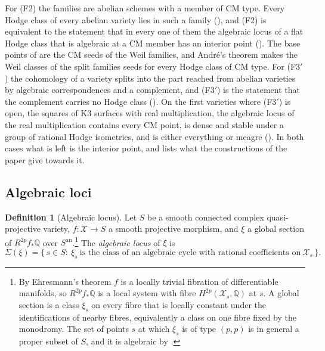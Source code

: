 \documentclass[11pt,reqno]{amsart}
\theoremstyle{plain}
\theoremstyle{definition}
\newtheorem{definition}[theorem]{Definition}
\theoremstyle{remark}
\newcommand{\QQ}{\mathbb{Q}}
\newcommand{\cX}{\mathcal{X}}
\begin{document}
For (F2) the families are abelian schemes with a member of CM type. Every
Hodge class of every abelian variety lies in such a family
(), and (F2) is equivalent to the statement that in every
one of them the algebraic locus of a flat Hodge class that is algebraic at a
CM member has an interior point (). The base points
of \cite[Theorem~17.5]{paperI} are the CM seeds of the Weil families, and
Andr\'e's theorem makes the Weil classes of the split families seeds for every
Hodge class of CM type. For \textup{(F3$'$)} the cohomology of a variety splits
into the part reached from abelian varieties by algebraic correspondences and
a complement, and \textup{(F3$'$)} is the statement that the complement
carries no Hodge class (). On the first varieties where
\textup{(F3$'$)} is open, the squares of K3 surfaces with real
multiplication, the algebraic locus of the real multiplication contains every
CM point, is dense and stable under a group of rational Hodge isometries, and
is either everything or meagre (). In both cases what is
left is the interior point, and  lists what the
constructions of the paper give towards it.

\subsection{Algebraic loci}\label{ssec:algloci}

\begin{definition}[Algebraic locus]\label{def:algloc}
Let $S$ be a smooth connected complex quasi-projective variety,
$f\colon\cX\to S$ a smooth projective morphism, and $\xi$ a global section of
$R^{2p}f_{*}\QQ$ over $S^{\mathrm{an}}$.\footnote{By Ehresmann's theorem $f$
is a locally trivial fibration of differentiable manifolds, so
$R^{2p}f_{*}\QQ$ is a local system with fibre $H^{2p}(\cX_{s},\QQ)$ at $s$. A
global section is a class $\xi_{s}$ on every fibre that is locally constant
under the identifications of nearby fibres, equivalently a class on one fibre
fixed by the monodromy. The set of points $s$ at which $\xi_{s}$ is of type
$(p,p)$ is in general a proper subset of $S$, and it is algebraic by
\cite[Theorem~B.6]{paperI}.} The \emph{algebraic locus} of $\xi$
is
\[
  \Sigma(\xi)=\{\,s\in S:\ \xi_{s}\ \text{is the class of an algebraic cycle
  with rational coefficients on}\ \cX_{s}\,\}.
\]
\end{definition}
\end{document}
